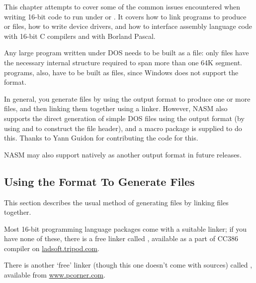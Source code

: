 %
%

This chapter attempts to cover some of the common issues encountered
when writing 16-bit code to run under  or .
It covers how to link programs to produce  or  files,
how to write  device drivers, and how to interface assembly
language code with 16-bit C compilers and with Borland Pascal.


Any large program written under DOS needs to be built as a 
file: only  files have the necessary internal structure
required to span more than one 64K segment.  programs,
also, have to be built as  files, since Windows does not
support the  format.

In general, you generate  files by using the  output
format to produce one or more  files, and then linking
them together using a linker. However, NASM also supports the direct
generation of simple DOS  files using the  output
format (by using  and  to construct the  file
header), and a macro package is supplied to do this. Thanks to
Yann Guidon for contributing the code for this.

NASM may also support  natively as another output format in
future releases.

\subsection{Using the  Format To Generate  Files}
\label{subsec:objexe}

This section describes the usual method of generating  files
by linking  files together.

Most 16-bit programming language packages come with a suitable
linker; if you have none of these, there is a free linker called
, available as a part of
CC386 compiler on \href{http://ladsoft.tripod.com/cc386\_compiler.html}
{ladsoft.tripod.com}.

There is another `free' linker (though this one doesn't come with
sources) called , available
from \href{http://www.pcorner.com/tpc/old/3-101.html}{www.pcorner.com}.

